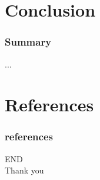 \documentclass[aspectratio=1610]{beamer}
\begin{document}
\section{Conclusion}
\begin{frame}
\frametitle{Summary}
...
\end{frame}

\section{References}
\begin{frame}
	\frametitle{references}
	\printbibliography
\end{frame}
\begin{frame}
  \centering
  \Huge{END\\Thank you}
\end{frame}
\end{document}
